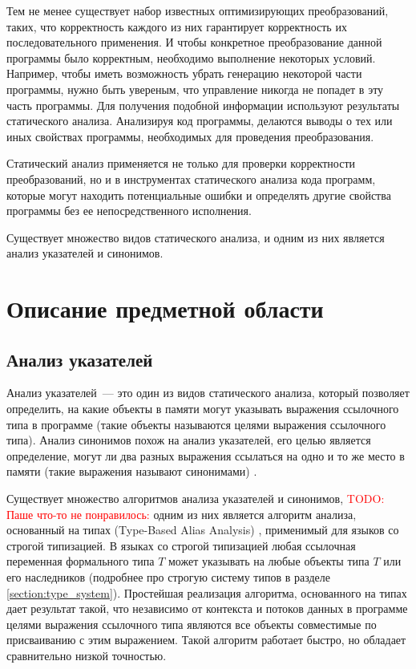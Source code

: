 \documentclass[14pt,titlepage]{extarticle}
\newcommand{\todo}[1]{\textcolor{red}{\eng{TODO}: #1}}
\newcommand{\eng}[1]{{\English#1}}
\let\oldsection\section
\renewcommand{\section}{\newpage\oldsection}
\begin{document}
    Тем не менее существует набор известных оптимизирующих преобразований,
    таких, что корректность каждого из них гарантирует корректность их
    последовательного применения.
    И чтобы конкретное преобразование данной программы было корректным,
    необходимо выполнение некоторых условий. Например, чтобы иметь
    возможность убрать генерацию некоторой части программы, нужно быть
    увереным, что управление никогда не попадет в эту часть программы.
    Для получения подобной информации используют результаты статического
    анализа. Анализируя код программы, делаются выводы о тех или иных свойствах
    программы, необходимых для проведения преобразования.

    Статический анализ применяется не только для проверки
    корректности преобразований, но и в инструментах статического анализа
    кода программ, которые могут находить потенциальные ошибки и определять
    другие свойства программы без ее непосредственного исполнения.

    Существует множество видов статического анализа, и одним из них
    является анализ указателей и синонимов.

  \section{Описание предметной области}

    \subsection{Анализ указателей}

      Анализ указателей~--- это один из видов статического анализа, который
      позволяет определить, на какие объекты в памяти могут указывать выражения
      ссылочного типа в программе (такие объекты называются целями выражения
      ссылочного типа). Анализ синонимов похож на анализ указателей, его целью
      является определение, могут ли два разных выражения ссылаться на одно и
      то же место в памяти (такие выражения называют синонимами)
      \cite{andersen}.

      Существует множество алгоритмов анализа указателей и синонимов,
      \todo{Паше что-то не понравилось:}
      одним из них является алгоритм анализа, основанный на типах
      (\eng{Type-Based Alias Analysis}) \cite{diwan_tbaa},
      применимый для языков со строгой типизацией.
      В языках со строгой типизацией любая ссылочная переменная формального типа
      $T$ может указывать на любые объекты типа $T$ или его наследников
      (подробнее про строгую систему типов в разделе \ref{section:type_system}).
      Простейшая реализация алгоритма, основанного на типах дает результат
      такой, что независимо от контекста и потоков данных в программе целями
      выражения ссылочного типа являются все объекты совместимые по
      присваиванию с этим выражением.
      Такой алгоритм работает быстро, но обладает сравнительно низкой точностью.
\end{document}

